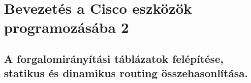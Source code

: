 \section{Bevezetés a Cisco eszközök programozásába 2}
\subsection{A forgalomirányítási táblázatok felépítése, statikus és dinamikus routing összehasonlítása.}
